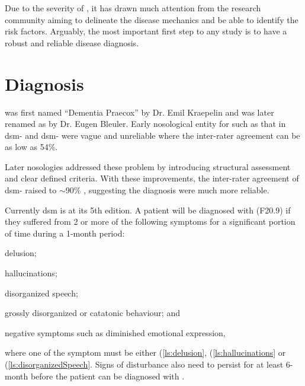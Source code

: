 \documentclass[12pt]{book}
\newcommand{\rom}[1]{\uppercase\expandafter{\romannumeral #1\relax}}
\newcommand*{\glng}{\glsentrylong}
\newcommand*{\Glng}{\Glsentrylong}
\begin{document}
	Due to the severity of \glng{scz}, it has drawn much attention from the research community aiming to delineate the disease mechanics and be able to identify the risk factors.
	Arguably, the most important first step to any \glng{scz} study is to have a robust and reliable disease diagnosis.
	
	\section{Diagnosis}
	\Glng{scz} was first named ``Dementia Praecox'' by Dr. Emil Kraepelin and was later renamed as \glng{scz} by Dr. Eugen Bleuler\citep{Jablensky2010}.
	Early nosological entity for \glng{scz} such as that in \gls{dsm}-\rom{1} and \gls{dsm}-\rom{2} were vague and unreliable where the inter-rater agreement can be as low as 54$\%$.\citep{Tsuang2000,Harvey2012} 
	
	Later nosologies addressed these problem by introducing structural assessment and clear defined criteria. 
	With these improvements, the inter-rater agreement of \gls{dsm}-\rom{3} raised to $\sim 90\%$ \citep{Harvey2012}, suggesting the diagnosis were much more reliable.
	
	Currently \gls{dsm} is at its 5th edition\citep{AmericanPsychiatricAssociation2013}. 
	A patient will be diagnosed with \glng{scz}(F20.9) if they suffered from 2 or more of the following symptoms for a significant portion of time during a 1-month period: 
	\begin{enumerate*}[label=\arabic*\upshape)]
		\item delusion; \label{ls:delusion}
		\item hallucinations;\label{ls:hallucinations}
		\item disorganized speech;\label{ls:disorganizedSpeech}
		\item grossly disorganized or catatonic behaviour; and\label{ls:catatonicBehavior}
		\item negative symptoms such as diminished emotional expression,\label{ls:negativeSymptoms}
	\end{enumerate*}  where one of the symptom must be either (\ref{ls:delusion}, (\ref{ls:hallucinations} or (\ref{ls:disorganizedSpeech}.
	Signs of disturbance also need to persist for at least 6-month before the patient can be diagnosed with \glng{scz}.
	
\end{document}
